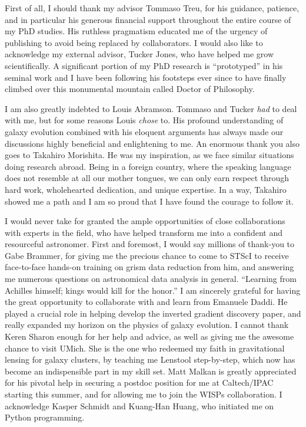 
First of all, I should thank my advisor Tommaso Treu, for his guidance, patience, and in particular his generous financial
support throughout the entire course of my PhD studies.
His ruthless pragmatism educated me of the urgency of publishing to avoid being replaced by collaborators.
I would also like to acknowledge my external advisor, Tucker Jones, who have helped me grow scientifically.
A significant portion of my PhD research is ``prototyped'' in his seminal work and I have been following his footsteps
ever since to have finally climbed over this monumental mountain called Doctor of Philosophy.

I am also greatly indebted to Louis Abramson. Tommaso and Tucker \emph{had} to deal with me, but for some reasons Louis \emph{chose} to.
His profound understanding of galaxy evolution combined with his eloquent arguments has always made our discussions highly
beneficial and enlightening to me.
An enormous thank you also goes to Takahiro Morishita.
He was my inspiration, as we face similar situations doing research abroad.
Being in a foreign country, where the speaking language does not resemble at all our mother tongues,
we can only earn respect through hard work, wholehearted dedication, and unique expertise.
In a way, Takahiro showed me a path and I am so proud that I have found the courage to follow it.

I would never take for granted the ample opportunities of close collaborations with experts in the field, who have
helped transform me into a confident and resourceful astronomer.
First and foremost, I would say millions of thank-you to Gabe Brammer, for giving me the precious chance to come to STScI to
receive face-to-face hands-on training on grism data reduction from him, and answering me numerous questions on
astronomical data analysis in general.  ``Learning from Achilles himself; kings would kill for the honor.'' I am
sincerely grateful for having the great opportunity to collaborate with and learn from Emanuele Daddi.  He played
a crucial role in helping develop the inverted gradient discovery paper, and really expanded my horizon on the
physics of galaxy evolution. I cannot thank Keren Sharon enough for her help and advice, as well as giving me the
awesome chance to visit UMich.  She is the one who redeemed my faith in gravitational lensing
for galaxy clusters, by teaching me Lenstool step-by-step, which now has become an indispensible part in my skill
set.  Matt Malkan is greatly appreciated for his pivotal help in securing a postdoc position for me at
Caltech/IPAC starting this summer, and for allowing me to join the WISPs collaboration.  I acknowledge Kasper
Schmidt and Kuang-Han Huang, who initiated me on Python programming.


